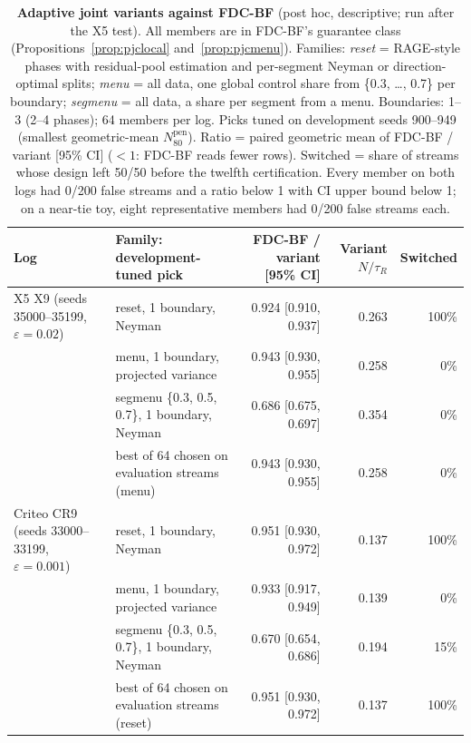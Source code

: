 \documentclass[sigconf,anonymous,review]{acmart}
\newcommand{\eps}{\varepsilon}
\newcommand{\Npen}{N_{80}^{\text{pen}}}
\begin{document}
\begin{table}[t]
\caption{\textbf{Adaptive joint variants against FDC-BF} (post hoc, descriptive; run after the X5 test). All members are in FDC-BF's guarantee class (Propositions~\ref{prop:pjclocal} and~\ref{prop:pjcmenu}). Families: \emph{reset} = RAGE-style phases with residual-pool estimation and per-segment Neyman or direction-optimal splits; \emph{menu} = all data, one global control share from \{0.3, \dots, 0.7\} per boundary; \emph{segmenu} = all data, a share per segment from a menu. Boundaries: 1--3 (2--4 phases); 64 members per log. Picks tuned on development seeds 900--949 (smallest geometric-mean $\Npen$). Ratio = paired geometric mean of FDC-BF / variant [95\% CI] ($<1$: FDC-BF reads fewer rows). Switched = share of streams whose design left 50/50 before the twelfth certification. Every member on both logs had 0/200 false streams and a ratio below 1 with CI upper bound below 1; on a near-tie toy, eight representative members had 0/200 false streams each.}
\label{tab:adaptive}
\small
\begin{tabular}{@{}llrrr@{}}
\toprule
Log & Family: development-tuned pick & FDC-BF / variant [95\% CI] & Variant $N/\tau_R$ & Switched \\
\midrule
X5 X9 (seeds 35000--35199, $\eps = 0.02$) & reset, 1 boundary, Neyman & 0.924 [0.910, 0.937] & 0.263 & 100\% \\
& menu, 1 boundary, projected variance & 0.943 [0.930, 0.955] & 0.258 & 0\% \\
& segmenu \{0.3, 0.5, 0.7\}, 1 boundary, Neyman & 0.686 [0.675, 0.697] & 0.354 & 0\% \\
& best of 64 chosen on evaluation streams (menu) & 0.943 [0.930, 0.955] & 0.258 & 0\% \\
\midrule
Criteo CR9 (seeds 33000--33199, $\eps = 0.001$) & reset, 1 boundary, Neyman & 0.951 [0.930, 0.972] & 0.137 & 100\% \\
& menu, 1 boundary, projected variance & 0.933 [0.917, 0.949] & 0.139 & 0\% \\
& segmenu \{0.3, 0.5, 0.7\}, 1 boundary, Neyman & 0.670 [0.654, 0.686] & 0.194 & 15\% \\
& best of 64 chosen on evaluation streams (reset) & 0.951 [0.930, 0.972] & 0.137 & 100\% \\
\bottomrule
\end{tabular}
\end{table}
\end{document}

